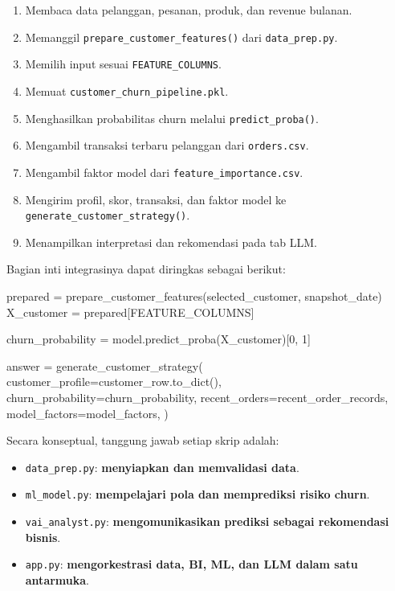 \documentclass[
  indonesian,
  letterpaper,
  DIV=11,
  numbers=noendperiod]{scrreprt}
\newenvironment{Shaded}{\begin{snugshade}}{\end{snugshade}}
\newcommand{\DecValTok}[1]{\textcolor[rgb]{0.68,0.00,0.00}{#1}}
\newcommand{\NormalTok}[1]{\textcolor[rgb]{0.00,0.23,0.31}{#1}}
\newcommand{\OperatorTok}[1]{\textcolor[rgb]{0.37,0.37,0.37}{#1}}
\providecommand{\tightlist}{%
  \setlength{\itemsep}{0pt}\setlength{\parskip}{0pt}}
\begin{document}
\begin{enumerate}
\def\labelenumi{\arabic{enumi}.}
\tightlist
\item
  Membaca data pelanggan, pesanan, produk, dan revenue bulanan.
\item
  Memanggil \texttt{prepare\_customer\_features()} dari
  \texttt{data\_prep.py}.
\item
  Memilih input sesuai \texttt{FEATURE\_COLUMNS}.
\item
  Memuat \texttt{customer\_churn\_pipeline.pkl}.
\item
  Menghasilkan probabilitas churn melalui \texttt{predict\_proba()}.
\item
  Mengambil transaksi terbaru pelanggan dari \texttt{orders.csv}.
\item
  Mengambil faktor model dari \texttt{feature\_importance.csv}.
\item
  Mengirim profil, skor, transaksi, dan faktor model ke
  \texttt{generate\_customer\_strategy()}.
\item
  Menampilkan interpretasi dan rekomendasi pada tab LLM.
\end{enumerate}

Bagian inti integrasinya dapat diringkas sebagai berikut:

\begin{Shaded}
\begin{Highlighting}[]
\NormalTok{prepared }\OperatorTok{=}\NormalTok{ prepare\_customer\_features(selected\_customer, snapshot\_date)}
\NormalTok{X\_customer }\OperatorTok{=}\NormalTok{ prepared[FEATURE\_COLUMNS]}

\NormalTok{churn\_probability }\OperatorTok{=}\NormalTok{ model.predict\_proba(X\_customer)[}\DecValTok{0}\NormalTok{, }\DecValTok{1}\NormalTok{]}

\NormalTok{answer }\OperatorTok{=}\NormalTok{ generate\_customer\_strategy(}
\NormalTok{    customer\_profile}\OperatorTok{=}\NormalTok{customer\_row.to\_dict(),}
\NormalTok{    churn\_probability}\OperatorTok{=}\NormalTok{churn\_probability,}
\NormalTok{    recent\_orders}\OperatorTok{=}\NormalTok{recent\_order\_records,}
\NormalTok{    model\_factors}\OperatorTok{=}\NormalTok{model\_factors,}
\NormalTok{)}
\end{Highlighting}
\end{Shaded}

Secara konseptual, tanggung jawab setiap skrip adalah:

\begin{itemize}
\tightlist
\item
  \texttt{data\_prep.py}: \textbf{menyiapkan dan memvalidasi data}.
\item
  \texttt{ml\_model.py}: \textbf{mempelajari pola dan memprediksi risiko
  churn}.
\item
  \texttt{vai\_analyst.py}: \textbf{mengomunikasikan prediksi sebagai
  rekomendasi bisnis}.
\item
  \texttt{app.py}: \textbf{mengorkestrasi data, BI, ML, dan LLM dalam
  satu antarmuka}.
\end{itemize}
\end{document}
